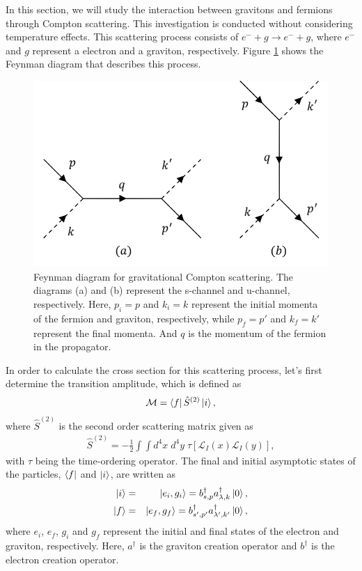 \documentclass[11pt,showpacs,preprintnumbers,amsmath,amssymb,prd,nofootinbib,superscriptaddress]{revtex4-2}
\begin{document}
In this section, we will study the interaction between gravitons and fermions through Compton scattering. This investigation is conducted without considering temperature effects. This scattering process consists of $e^-+g\rightarrow e^-+g$, where $e^-$ and $g$ represent a electron and a graviton, respectively. Figure \ref{fig1} shows the Feynman diagram that describes this process.
\begin{figure}[h]
    \centering
    \includegraphics[scale=0.3]{feynman.png}
    \caption{Feynman diagram for gravitational Compton scattering. The diagrams (a) and (b) represent the s-channel and u-channel, respectively. Here, $p_i = p$ and $k_i = k$ represent the initial momenta of the fermion and graviton, respectively, while $p_f = p'$ and $k_f = k'$ represent the final momenta. And $q$ is the momentum of the fermion in the propagator.}
    \label{fig1}
\end{figure}

In order to calculate the cross section for this scattering process, let's first determine the transition amplitude, which is defined as
\begin{eqnarray}
    \mathcal{M}=\bra{f}\hat{S}^{(2)}\ket{i},\label{18}
\end{eqnarray}
where $\hat{S}^{(2)}$ is the second order scattering matrix given as
\begin{eqnarray}
     \hat{S}^{(2)}=-\frac{1}{2}\int\int d^4x\;d^4y \;\tau[\mathcal{L}_I(x)\mathcal{L}_I(y)],
\end{eqnarray}
with $\tau$ being the time-ordering operator. The final and initial asymptotic states of the particles,  $\bra{f}$ and $\ket{i}$, are written as
\begin{eqnarray}
    \ket{i}&=&\ket{e_i,g_i}=b_{s,p}^\dagger a_{\lambda,k}^\dagger\ket{0},\nonumber\\
     \ket{f}&=&\ket{e_f,g_f}=b_{s^\prime,p^\prime}^\dagger a_{\lambda^\prime,k^\prime}^\dagger\ket{0},
\end{eqnarray}
where $e_i$, $e_f$, $g_i$ and $g_f$ represent the initial and final states of the electron and graviton, respectively. Here, $a^\dagger$ is the graviton creation operator  and $b^\dagger$ is the electron creation operator.
\end{document}

